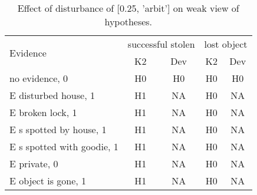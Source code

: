 \begin{table}\begin{tabular}{l|cc|cc}\toprule\multirow{2}{*}{Evidence} & \multicolumn{2}{c}{successful stolen}& \multicolumn{2}{c}{lost object}\\& {K2} & {Dev}& {K2} & {Dev}\\\midrule
no evidence, 0 & H0&H0&H0&H0\\E disturbed house, 1 & \cellcolor{Bittersweet}H1&\cellcolor{Bittersweet}NA&\cellcolor{Bittersweet}H0&\cellcolor{Bittersweet}NA\\E broken lock, 1 & \cellcolor{Bittersweet}H1&\cellcolor{Bittersweet}NA&\cellcolor{Bittersweet}H0&\cellcolor{Bittersweet}NA\\E s spotted by house, 1 & \cellcolor{Bittersweet}H1&\cellcolor{Bittersweet}NA&\cellcolor{Bittersweet}H0&\cellcolor{Bittersweet}NA\\E s spotted with goodie, 1 & \cellcolor{Bittersweet}H1&\cellcolor{Bittersweet}NA&\cellcolor{Bittersweet}H0&\cellcolor{Bittersweet}NA\\E private, 0 & \cellcolor{Bittersweet}H1&\cellcolor{Bittersweet}NA&\cellcolor{Bittersweet}H0&\cellcolor{Bittersweet}NA\\E object is gone, 1 & \cellcolor{Bittersweet}H1&\cellcolor{Bittersweet}NA&\cellcolor{Bittersweet}H0&\cellcolor{Bittersweet}NA\\\bottomrule\end{tabular}\caption{Effect of disturbance of [0.25, 'arbit'] on weak view of hypotheses.}\end{table}